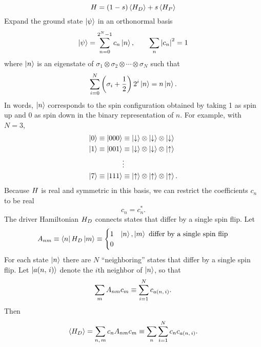 \begin{equation}
  H = (1 - s) \left< H_D \right> + s \left< H_P \right>
  \label{}
\end{equation}
Expand the ground state $\left| \psi \right>$ in an orthonormal basis
\begin{equation}
  \left| \psi \right> = \sum_{n=0}^{2^N-1} c_n \left| n \right>,
  \qquad
  \sum_n \left| c_n \right|^2 = 1
  \label{}
\end{equation}
where $\left| n \right>$ is an eigenstate of
$\sigma_1 \otimes \sigma_2 \otimes \cdots \otimes \sigma_N$
such that
\begin{equation}
    \sum_{i=0}^N \left( \sigma_i + \frac{1}{2} \right) 2^i \left| n \right> = n \left| n \right>.
  \label{}
\end{equation}
In words, $\left| n \right>$ corresponds to the spin configuration obtained by taking 1
as spin up and 0 as spin down in the binary representation of $n$.
For example, with $N=3$,
\begin{align*}
  \left| 0 \right> \equiv \left| 000 \right>
  &\equiv
  \left| \downarrow \right> \otimes
  \left| \downarrow \right> \otimes
  \left| \downarrow \right> \\
  \left| 1 \right> \equiv \left| 001 \right>
  &\equiv
  \left| \downarrow \right> \otimes
  \left| \downarrow \right> \otimes
  \left| \uparrow \right> \\
  &\vdots \\
  \left| 7 \right> \equiv \left| 111 \right>
  &\equiv
  \left| \uparrow \right> \otimes
  \left| \uparrow \right> \otimes
  \left| \uparrow \right>.
  \label{}
\end{align*}
Because $H$ is real and symmetric in this basis, we can restrict the
coefficients $c_n$ to be real
\begin{equation}
  c_n = c_n^*.
  \label{}
\end{equation}
The driver Hamiltonian $H_D$ connects states that differ by a single spin
flip. Let
\begin{equation}
  A_{n m}
  \equiv \matrixel{n}{\ham_D}{m}
  \equiv \begin{cases}
    1 & \ket{n}, \ket{m} \text{ differ by a single spin flip} \\
    0
  \end{cases}
  \label{}
\end{equation}
For each state $\left| n \right>$ there are $N$ ``neighboring'' states that differ by a
single spin flip. Let $\left| a(n,\,i) \right>$ denote the $i$th neighbor of
$\left| n \right>$, so that
\begin{equation}
  \sum_m A_{n m} c_m \equiv \sum_{i=1}^N c_{a(n,\,i)}.
  \label{}
\end{equation}
Then
\begin{equation}
  \left< H_D \right>
  = \sum_{n,\,m} c_n A_{n m} c_m
  \equiv \sum_n \sum_{i=1}^N c_n c_{a(n,\,i)}.
  \label{}
\end{equation}
